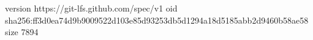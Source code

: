 version https://git-lfs.github.com/spec/v1
oid sha256:ff3d0ea74d9b9009522d103e85d93253db5d1294a18d5185abb2d9460b58ae58
size 7894
